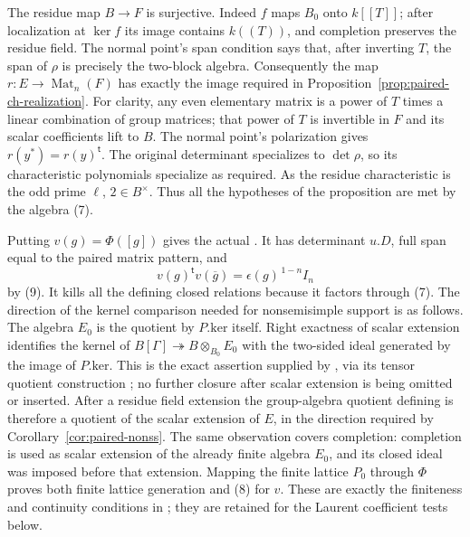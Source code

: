 The residue map $B\to F$ is surjective.  Indeed $f$ maps $B_0$ onto
$k[[T]]$; after localization at $\ker f$ its image contains
$k((T))$, and completion preserves the residue field.
The normal point's span condition says that, after inverting
$T$, the span of $\rho$ is precisely the two-block algebra.
Consequently the map $r:E\to\operatorname{Mat}_n(F)$ has exactly
the image required in Proposition~\ref{prop:paired-ch-realization}.
For clarity, any even elementary matrix is a power of $T$ times
a linear combination of group matrices; that power of $T$ is
invertible in $F$ and its scalar coefficients lift to $B$.
The normal point's polarization gives
$r(y^*)=r(y)^{\mathsf t}$.
The original determinant specializes to $\det\rho$, so its
characteristic polynomials specialize as required.
As the residue characteristic is the odd prime $\ell$,
$2\in B^\times$.  Thus all the hypotheses of the proposition
are met by the algebra (7).

Putting $v(g)=\Phi([g])$ gives the actual .
It has determinant $u.D$, full span equal to the paired matrix
pattern, and
\[
 v(g)^{\mathsf t}v(\overline g)
                  =\epsilon(g)^{\,1-n}I_n
\]
by (9).  It kills all the defining closed relations because it
factors through (7).  The direction of the kernel comparison
needed for nonsemisimple support is as follows.
The algebra $E_0$ is the quotient by $P.\mathrm{ker}$ itself.
Right exactness of scalar extension identifies the kernel of
$B[\Gamma]\twoheadrightarrow B\otimes_{B_0}E_0$ with the
two-sided ideal generated by the image of $P.\mathrm{ker}$.
This is the exact  assertion supplied by
, via its tensor quotient construction
; no further closure after scalar extension is
being omitted or inserted.
After a residue field extension the group-algebra quotient
defining  is therefore a quotient of the
scalar extension of $E$, in the direction required by
Corollary~\ref{cor:paired-nonss}.
The same observation covers completion: completion is used as
scalar extension of the already finite algebra $E_0$, and its
closed ideal was imposed before that extension.  Mapping the finite lattice $P_0$
through $\Phi$ proves both finite lattice generation and (8) for
$v$.  These are exactly the finiteness and continuity conditions
in ; they are retained for the Laurent coefficient
tests below.


